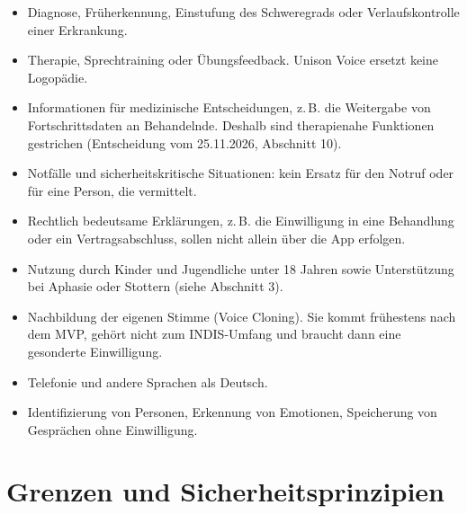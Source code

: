 \documentclass[a4paper]{article}
\begin{document}
\begin{itemize}
\item Diagnose, Früherkennung, Einstufung des Schweregrads oder Verlaufskontrolle einer Erkrankung.
\item Therapie, Sprechtraining oder Übungsfeedback. Unison Voice ersetzt keine Logopädie.
\item Informationen für medizinische Entscheidungen, z.\,B. die Weitergabe von Fortschrittsdaten an Behandelnde. Deshalb sind therapienahe Funktionen gestrichen (Entscheidung vom 25.11.2026, Abschnitt 10).
\item Notfälle und sicherheitskritische Situationen: kein Ersatz für den Notruf oder für eine Person, die vermittelt.
\item Rechtlich bedeutsame Erklärungen, z.\,B. die Einwilligung in eine Behandlung oder ein Vertragsabschluss, sollen nicht allein über die App erfolgen.
\item Nutzung durch Kinder und Jugendliche unter 18 Jahren sowie Unterstützung bei Aphasie oder Stottern (siehe Abschnitt 3).
\item Nachbildung der eigenen Stimme (Voice Cloning). Sie kommt frühestens nach dem MVP, gehört nicht zum INDIS-Umfang und braucht dann eine gesonderte Einwilligung.
\item Telefonie und andere Sprachen als Deutsch.
\item Identifizierung von Personen, Erkennung von Emotionen, Speicherung von Gesprächen ohne Einwilligung.
\end{itemize}

\section{Grenzen und Sicherheitsprinzipien}
\end{document}
